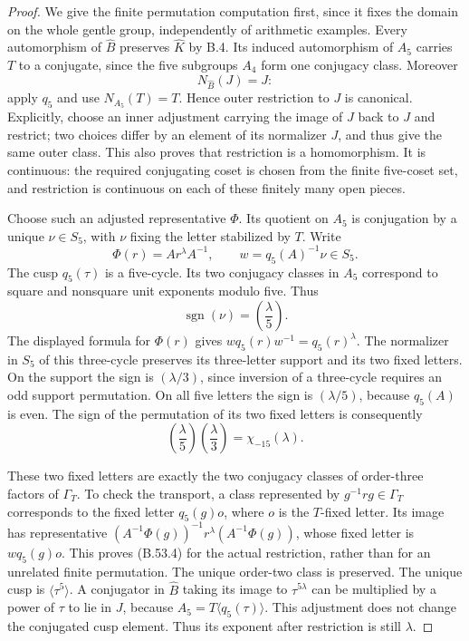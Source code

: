 \begin{proof}
We give the finite permutation computation first, since it fixes
the domain on the whole gentle group, independently of arithmetic
examples. Every automorphism of $\widehat B$ preserves
$\widehat K$ by B.4. Its induced automorphism of $A_5$ carries
$T$ to a conjugate, since the five subgroups $A_4$ form one
conjugacy class. Moreover
\[
                    N_{\widehat B}(J)=J:
\]
apply $q_5$ and use $N_{A_5}(T)=T$. Hence outer restriction to
$J$ is canonical. Explicitly, choose an inner adjustment carrying
the image of $J$ back to $J$ and restrict; two choices differ by
an element of its normalizer $J$, and thus give the same outer
class. This also proves that restriction is a homomorphism.
It is continuous: the required conjugating coset is chosen from
the finite five-coset set, and restriction is continuous on each
of these finitely many open pieces.

Choose such an adjusted representative $\Phi$. Its quotient
on $A_5$ is conjugation by a unique $\nu\in S_5$, with $\nu$
fixing the letter stabilized by $T$. Write
\[
          \Phi(r)=A r^\lambda A^{-1},\qquad
          w=q_5(A)^{-1}\nu\in S_5.
\]
The cusp $q_5(\tau)$ is a five-cycle. Its two conjugacy classes
in $A_5$ correspond to square and nonsquare unit exponents
modulo five. Thus
\[
                \operatorname{sgn}(\nu)=\left(\frac\lambda5\right).
                                                               \tag{B.53.3}
\]
The displayed formula for $\Phi(r)$ gives
$wq_5(r)w^{-1}=q_5(r)^\lambda$. The normalizer in $S_5$ of
this three-cycle preserves its three-letter support and its
two fixed letters. On the support the sign is
$(\lambda/3)$, since inversion of a three-cycle requires an
odd support permutation. On all five letters the sign is
$(\lambda/5)$, because $q_5(A)$ is even. The sign of the
permutation of its two fixed letters is consequently
\[
                 \left(\frac\lambda5\right)
                 \left(\frac\lambda3\right)
                           =\chi_{-15}(\lambda).           \tag{B.53.4}
\]

These two fixed letters are exactly the two conjugacy classes
of order-three factors of $\Gamma_T$. To check the transport,
a class represented by $g^{-1}rg\in\Gamma_T$ corresponds to
the fixed letter $q_5(g)o$, where $o$ is the $T$-fixed letter.
Its image has representative
$(A^{-1}\Phi(g))^{-1}r^\lambda(A^{-1}\Phi(g))$, whose fixed
letter is $wq_5(g)o$. This proves (B.53.4) for the actual
restriction, rather than for an unrelated finite permutation.
The unique order-two class is preserved. The unique cusp is
$\langle\tau^5\rangle$. A conjugator in $\widehat B$ taking
its image to $\tau^{5\lambda}$ can be multiplied by a power
of $\tau$ to lie in $J$, because $A_5=T\langle q_5(\tau)\rangle$.
This adjustment does not change the conjugated cusp element.
Thus its exponent after restriction is still $\lambda$.


\end{proof}
